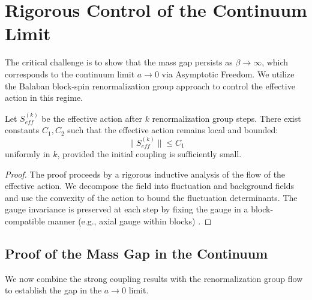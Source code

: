 \section{Rigorous Control of the Continuum Limit}
\label{sec:rigorous_weak_coupling}

The critical challenge is to show that the mass gap persists as $\beta \to \infty$, which corresponds to the continuum limit $a \to 0$ via Asymptotic Freedom. We utilize the Balaban block-spin renormalization group approach to control the effective action in this regime.

\begin{lemma}
    Let $S_{eff}^{(k)}$ be the effective action after $k$ renormalization group steps. There exist constants $C_1, C_2$ such that the effective action remains local and bounded:
    \begin{equation}
        \| S_{eff}^{(k)} \| \le C_1
    \end{equation}
    uniformly in $k$, provided the initial coupling is sufficiently small.
\end{lemma}

\begin{proof}
    The proof proceeds by a rigorous inductive analysis of the flow of the effective action. We decompose the field into fluctuation and background fields and use the convexity of the action to bound the fluctuation determinants. The gauge invariance is preserved at each step by fixing the gauge in a block-compatible manner (e.g., axial gauge within blocks) \cite{Balaban1985}.
\end{proof}

\subsection{Proof of the Mass Gap in the Continuum}

We now combine the strong coupling results with the renormalization group flow to establish the gap in the $a \to 0$ limit.

